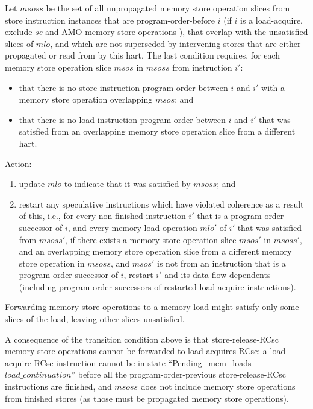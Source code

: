 Let $msoss$ be the set of all unpropagated memory store operation slices from store instruction instances that are program-order-before $i$ (if $i$ is a load-acquire, exclude {\em sc} and AMO memory store operations ), that overlap with the unsatisfied slices of $mlo$, and which are not superseded by intervening stores that are either propagated or read from by this hart.
The last condition requires, for each memory store operation slice $msos$ in $msoss$ from instruction $i'$:
\begin{itemize}
\item that there is no store instruction program-order-between $i$ and $i'$ with a memory store operation overlapping $msos$; and
\item that there is no load instruction program-order-between $i$ and $i'$ that was satisfied from an overlapping memory store operation slice from a different hart.
\end{itemize}
Action:
\begin{enumerate}
\item update $mlo$ to indicate that it was satisfied by $msoss$; and
\item restart any speculative instructions which have violated coherence as a result of this, i.e., for every non-finished instruction $i'$ that is a program-order-successor of $i$, and every memory load operation $mlo'$ of $i'$ that was satisfied from $msoss'$, if there exists a memory store operation slice $msos'$ in $msoss'$, and an overlapping memory store operation slice from a different memory store operation in $msoss$, and $msos'$ is not from an instruction that is a program-order-successor of $i$, restart $i'$ and its data-flow dependents (including program-order-successors of restarted load-acquire instructions).
\end{enumerate}

\begin{commentary}
Forwarding memory store operations to a memory load might satisfy only some slices of the load, leaving other slices unsatisfied.

A consequence of the transition condition above is that store-release-RCsc memory store operations cannot be forwarded to load-acquires-RCsc:
a load-acquire-RCsc instruction cannot be in state ``{\sc Pending\_mem\_loads} $load\_continuation$'' before all the program-order-previous store-release-RCsc instructions are finished, and $msoss$ does not include memory store operations from finished stores (as those must be propagated memory store operations).
\end{commentary}


